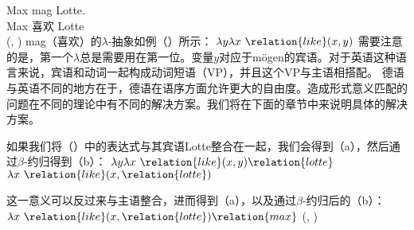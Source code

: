 \gll Max mag Lotte.\\
     Max 喜欢 Lotte\\
\ex {}(, )
\zl
mag（喜欢）的$\lambda$-抽象如例（）所示：
\ea
$\lambda y \lambda x~\relation{like}(x, y)$
\z
需要注意的是，第一个$\lambda$总是需要用在第一位。变量$y$对应于mögen的宾语。对于英语这种语言来说，宾语和动词一起构成动词短语（VP），并且这个VP与主语相搭配。
德语与英语不同的地方在于，德语在语序方面允许更大的自由度。造成形式意义匹配的问题在不同的理论中有不同的解决方案。我们将在下面的章节中来说明具体的解决方案。

如果我们将（）中的表达式与其宾语Lotte整合在一起，我们会得到（a），然后通过$\beta$-约归得到（b）：
\eal
\label{lambda-moegen}
\ex $\lambda y \lambda x~\relation{like}(x, y) \relation{lotte}$
\ex $\lambda x~\relation{like}(x, \relation{lotte})$
\zl

\noindent
这一意义可以反过来与主语整合，进而得到（a），以及通过$\beta$-约归后的（b）：
\eal
\ex $\lambda x~\relation{like}(x, \relation{lotte}) \relation{max}$
\ex {}(, )
\zl

